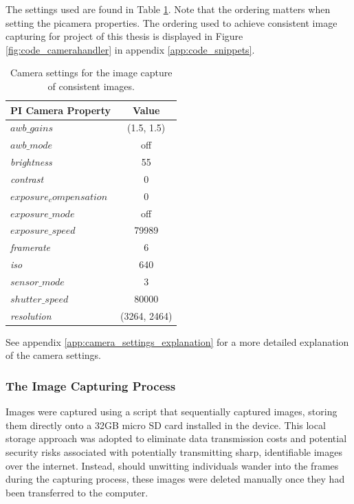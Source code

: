 The settings used are found in Table \ref{tab:picamera_settings}. Note that the ordering matters when setting the picamera properties. The ordering used to achieve consistent image capturing for project of this thesis is displayed in Figure \ref{fig:code_camerahandler} in appendix \ref{app:code_snippets}.

\begin{table}[H]
    \centering
    \renewcommand{\arraystretch}{1.5} %
    \setlength{\tabcolsep}{1em}
    \begin{tabular}{|l|c|}
        \hline
        \rowcolor{gray!25}
        \textbf{PI Camera Property} & \textbf{Value} \\ \hline
        $awb\_gains$                & (1.5, 1.5)     \\ \hline
        $awb\_mode$                 & off            \\ \hline
        \textit{brightness}         & 55             \\ \hline
        \textit{contrast}           & 0              \\ \hline
        $exposure_compensation$     & 0              \\ \hline
        $exposure\_mode$            & off            \\ \hline
        $exposure\_speed$           & 79989          \\ \hline
        \textit{framerate}          & 6              \\ \hline
        \textit{iso}                & 640            \\ \hline
        $sensor\_mode$              & 3              \\ \hline
        $shutter\_speed$            & 80000          \\ \hline
        \textit{resolution}         & (3264, 2464)   \\ \hline
    \end{tabular}
    \caption{\centering Camera settings for the image capture of consistent images.}
    {See appendix \ref{app:camera_settings_explanation} for a more detailed explanation of the camera settings.}
    \label{tab:picamera_settings}
\end{table}

\subsubsection{The Image Capturing Process}
Images were captured using a script that sequentially captured images, storing them directly onto a 32GB micro SD card installed in the device. This local storage approach was adopted to eliminate data transmission costs and potential security risks associated with potentially transmitting sharp, identifiable images over the internet. Instead, should unwitting individuals wander into the frames during the capturing process, these images were deleted manually once they had been transferred to the computer. 

